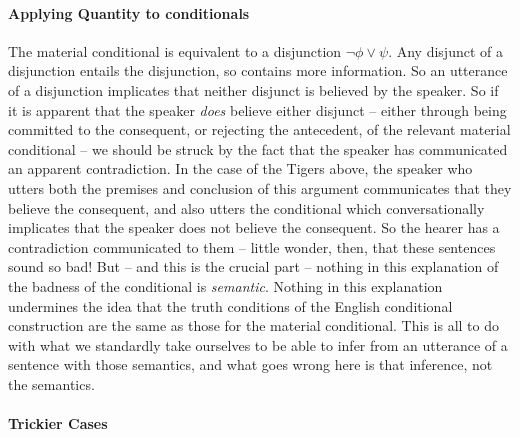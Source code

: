 \paragraph{Applying Quantity to conditionals}
  
The material conditional is equivalent to a disjunction $\neg \phi \vee \psi$. Any disjunct of a disjunction entails the disjunction, so contains more information. So an utterance of a disjunction implicates that neither disjunct is believed by the speaker. So if it is apparent that the speaker \emph{does} believe either disjunct – either through being committed to the consequent, or rejecting the antecedent, of the relevant material conditional – we should be struck by the fact that the speaker has communicated an apparent contradiction. In the case of the Tigers above, the speaker who utters both the premises and conclusion of this argument communicates that they believe the consequent, and also utters the conditional which conversationally implicates that the speaker does not believe the consequent. So the hearer has a contradiction communicated to them – little wonder, then, that these sentences sound so bad! But – and this is the crucial part – nothing in this explanation of the badness of the conditional is \emph{semantic}. Nothing in this explanation undermines the idea that the truth conditions of the English conditional construction are the same as those for the material conditional. This is all to do with what we standardly take ourselves to be able to infer from an utterance of a sentence with those semantics, and what goes wrong here is that inference, not the semantics.

\paragraph{Trickier Cases}

